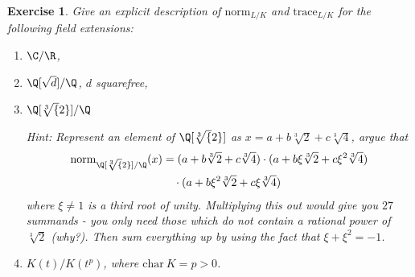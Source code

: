 \documentclass[a4paper,10pt,reqno]{amsart}
\newtheorem{ex}{Exercise}[section]
\begin{document}
\begin{ex}
\label{10.3}
    Give an explicit description of $\mathrm{norm}_{L/K}$ and $\mathrm{trace}_{L/K}$ for the following field extensions:
    \begin{enumerate}[label=(\roman*)]
        \item $\C/\R$,
        \item $\Q[\sqrt{d}]/\Q$, $d$ squarefree,
        \item $\Q[\sqrt[3]{2}]/\Q$

        \noindent \textit{Hint:} Represent an element of $\Q[\sqrt[3]{2}]$ as $x = a + b \sqrt[3]{2} + c \sqrt[3]{4}$, argue that
        \begin{align*}
        \mathrm{norm}_{\Q[\sqrt[3]{2}]/\Q}(x) & = (a + b \sqrt[3]{2} + c \sqrt[3]{4}) \cdot (a + b\xi \sqrt[3]{2} + c\xi^2 \sqrt[3]{4}) \\
        & \quad \cdot (a + b\xi^2 \sqrt[3]{2} + c \xi\sqrt[3]{4})
        \end{align*}
        where $\xi \neq 1$ is a third root of unity. Multiplying this out would give you $27$ summands - you only need those which do not contain a rational power of $\sqrt[3]{2}$ (why?). Then sum everything up by using the fact that $\xi + \xi^2 = -1$.
        \item $K(t)/K(t^p)$, where $\mathrm{char}\ K = p > 0$.
    \end{enumerate}
\end{ex}
\end{document}
